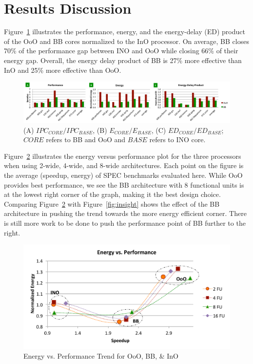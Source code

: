 \section{Results Discussion}
\label{sec:discussion}


Figure~\ref{fig:overall} illustrates the performance, energy, and the
energy-delay (ED) product  of the OoO and BB cores normalized to the InO
processor.  On average, BB closes 70\% of the performance gap between INO and
OoO while closing 66\% of their energy gap. Overall, the energy delay product of
BB is 27\% more effective than InO and 25\% more effective than OoO.
\begin{figure}[h]
	\centering
	\includegraphics[width=\textwidth]{result/overall_perf.pdf} 
    \caption{(A) $IPC_{CORE}/IPC_{BASE}$, (B) $E_{CORE}/E_{BASE}$, (C)
        $ED_{CORE}/ED_{BASE}$; $CORE$ refers to BB and OoO and $BASE$ refers to
            INO core.}
	\label{fig:overall}
\end{figure}

Figure~\ref{fig:ep} illustrates the energy versus performance plot for the three
processors when using 2-wide, 4-wide, and 8-wide architectures. Each point on
the figure is the average (speedup, energy) of SPEC benchmarks evaluated here.
While OoO provides best performance, we see the BB architecture with 8
functional units is at the lowest right corner of the graph, making it the best
design choice. Comparing Figure~\ref{fig:ep} with Figure~\ref{fig:insight} shows
the effect of the BB architecture in pushing the trend towards the more energy
efficient corner. There is still more work to be done to push the performance
point of BB further to the right.
\begin{figure}[!htbp]
	\centering
	\includegraphics[width=1.0\columnwidth]{result/ep.pdf} 
    \caption{Energy vs. Performance Trend for OoO, BB, \& InO}
	\label{fig:ep}
\end{figure}

